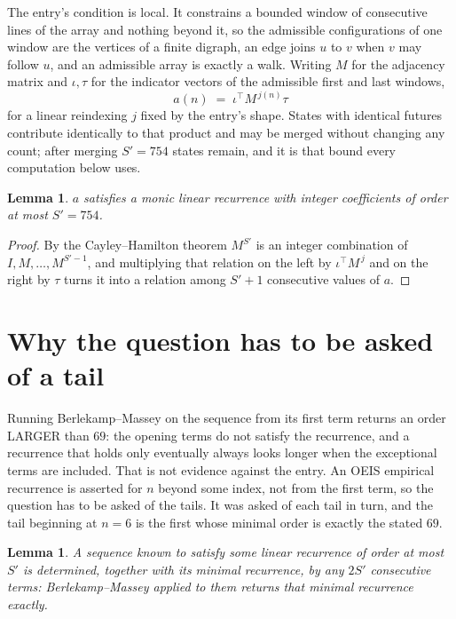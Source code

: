 \documentclass[11pt,a4paper]{article}
\theoremstyle{plain}
\newtheorem{lemma}[theorem]{Lemma}
\theoremstyle{definition}
\begin{document}
The entry's condition is local. It constrains a bounded window of consecutive lines of the
array and nothing beyond it, so the admissible configurations of one window are the vertices of
a finite digraph, an edge joins $u$ to $v$ when $v$ may follow $u$, and an admissible array is
exactly a walk. Writing $M$ for the adjacency matrix and $\iota,\tau$ for the indicator vectors
of the admissible first and last windows,
\[
a(n)\;=\;\iota^{\!\top}M^{\,j(n)}\tau
\]
for a linear reindexing $j$ fixed by the entry's shape. States with identical futures
contribute identically to that product and may be merged without changing any count; after
merging $S'=754$ states remain, and it is that bound every computation below uses.

\begin{lemma}\label{lem:cf}
$a$ satisfies a monic linear recurrence with integer coefficients of order at most $S'=754$.
\end{lemma}

\begin{proof}
By the Cayley--Hamilton theorem $M^{S'}$ is an integer combination of $I,M,\dots,M^{S'-1}$,
and multiplying that relation on the left by $\iota^{\!\top}M^{\,j}$ and on the right by
$\tau$ turns it into a relation among $S'+1$ consecutive values of $a$.
\end{proof}

\section{Why the question has to be asked of a tail}

Running Berlekamp--Massey on the sequence from its first term returns an order LARGER than $69$: the opening terms do not satisfy the recurrence, and a recurrence that holds only eventually always looks longer when the exceptional terms are included. That is not evidence against the entry. An OEIS empirical recurrence is asserted for $n$ beyond some index, not from the first term, so the question has to be asked of the tails. It was asked of each tail in turn, and the tail beginning at $n=6$ is the first whose minimal order is exactly the stated $69$.

\begin{lemma}\label{lem:bm}
A sequence known to satisfy some linear recurrence of order at most $S'$ is determined,
together with its minimal recurrence, by any $2S'$ consecutive terms: Berlekamp--Massey applied
to them returns that minimal recurrence exactly.
\end{lemma}
\end{document}
